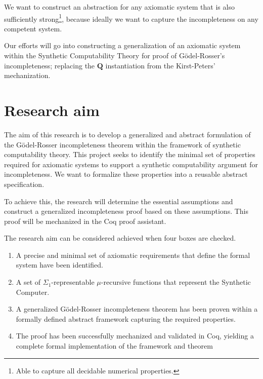 \documentclass[a4paper]{scrartcl}
\begin{document}
We want to construct an abstraction for any axiomatic system that is also sufficiently strong\footnote{Able to capture all decidable numerical properties.\cite[p.~50]{Smith_2013}}, because ideally we want to capture the incompleteness on any competent system.

Our efforts will go into constructing a generalization of an axiomatic system within the Synthetic Computability Theory for proof of Gödel-Rosser's incompleteness; replacing the $\mathbf{Q}$ instantiation from the Kirst-Peters' mechanization.

\section{Research aim}
\label{sec:aim}


The aim of this research is to develop a generalized and abstract formulation of the Gödel-Rosser incompleteness theorem within the framework of synthetic computability theory. This project seeks to identify the minimal set of properties required for axiomatic systems to support a synthetic computability argument for incompleteness. We want to formalize these properties into a reusable abstract specification.

To achieve this, the research will determine the essential assumptions and construct a generalized incompleteness proof based on these assumptions. This proof will be mechanized in the Coq proof assistant.

The research aim can be considered achieved when four boxes are checked.
\begin{enumerate}
    \item A precise and minimal set of axiomatic requirements that define the formal system have been identified.
    \item A set of $\Sigma_1$-representable $\mu$-recursive functions that represent the Synthetic Computer.
    \item A generalized Gödel-Rosser incompleteness theorem has been proven within a formally defined abstract framework capturing the required properties.
    \item The proof has been successfully mechanized and validated in Coq, yielding a complete formal implementation of the framework and theorem
\end{enumerate}
\end{document}
